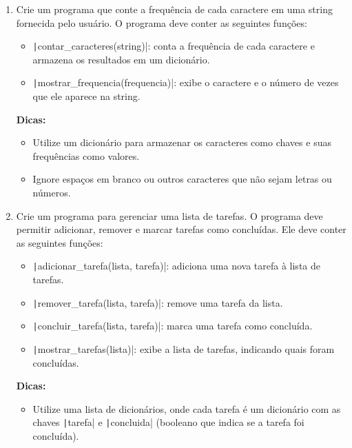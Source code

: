 \documentclass[12pt]{article}
\begin{document}
\begin{enumerate}
  \item Crie um programa que conte a frequência de cada caractere em uma string fornecida pelo usuário. O programa deve conter as seguintes funções:
    \begin{itemize}
      \item \texttt|contar_caracteres(string)|: conta a frequência de cada caractere e armazena os resultados em um dicionário.
      \item \texttt|mostrar_frequencia(frequencia)|: exibe o caractere e o número de vezes que ele aparece na string.
    \end{itemize}
    \textbf{Dicas:}
    \begin{itemize}
      \item Utilize um dicionário para armazenar os caracteres como chaves e suas frequências como valores.
      \item Ignore espaços em branco ou outros caracteres que não sejam letras ou números.
    \end{itemize}

    \newpage

  \item Crie um programa para gerenciar uma lista de tarefas. O programa deve permitir adicionar, remover e marcar tarefas como concluídas. Ele deve conter as seguintes funções:
    \begin{itemize}
      \item \texttt|adicionar_tarefa(lista, tarefa)|: adiciona uma nova tarefa à lista de tarefas.
      \item \texttt|remover_tarefa(lista, tarefa)|: remove uma tarefa da lista.
      \item \texttt|concluir_tarefa(lista, tarefa)|: marca uma tarefa como concluída.
      \item \texttt|mostrar_tarefas(lista)|: exibe a lista de tarefas, indicando quais foram concluídas.
    \end{itemize}
    \textbf{Dicas:}
    \begin{itemize}
      \item Utilize uma lista de dicionários, onde cada tarefa é um dicionário com as chaves \texttt|tarefa| e \texttt|concluida| (booleano que indica se a tarefa foi concluída).
    \end{itemize}


\end{enumerate}
\end{document}
